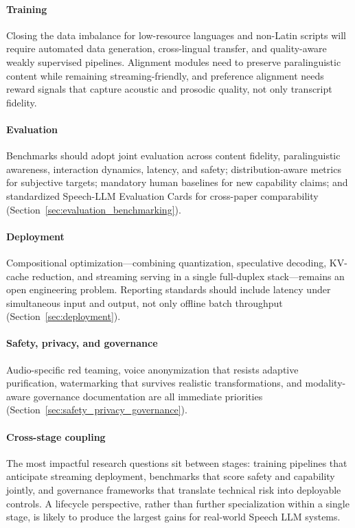 \paragraph{Training} Closing the data imbalance for low-resource
languages and non-Latin scripts will require automated data generation,
cross-lingual transfer, and quality-aware weakly supervised pipelines.
Alignment modules need to preserve paralinguistic content while
remaining streaming-friendly, and preference alignment needs reward
signals that capture acoustic and prosodic quality, not only transcript
fidelity.

\paragraph{Evaluation} Benchmarks should adopt joint evaluation across
content fidelity, paralinguistic awareness, interaction dynamics,
latency, and safety; distribution-aware metrics for subjective targets;
mandatory human baselines for new capability claims; and standardized
Speech-LLM Evaluation Cards for cross-paper comparability
(Section~\ref{sec:evaluation_benchmarking}).

\paragraph{Deployment} Compositional optimization---combining
quantization, speculative decoding, KV-cache reduction, and streaming
serving in a single full-duplex stack---remains an open engineering
problem. Reporting standards should include latency under simultaneous
input and output, not only offline batch throughput
(Section~\ref{sec:deployment}).

\paragraph{Safety, privacy, and governance} Audio-specific red teaming,
voice anonymization that resists adaptive purification, watermarking
that survives realistic transformations, and modality-aware governance
documentation are all immediate priorities
(Section~\ref{sec:safety_privacy_governance}).

\paragraph{Cross-stage coupling} The most impactful research questions
sit between stages: training pipelines that anticipate streaming
deployment, benchmarks that score safety and capability jointly, and
governance frameworks that translate technical risk into deployable
controls. A lifecycle perspective, rather than further specialization
within a single stage, is likely to produce the largest gains for
real-world Speech LLM systems.
